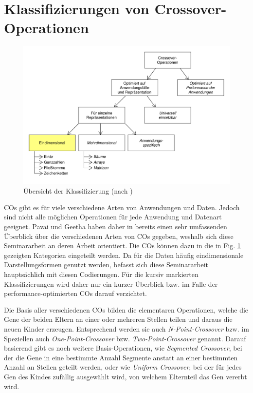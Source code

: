 \documentclass{llncs}
\begin{document}
	\section{Klassifizierungen von Crossover-Operationen}
	\label{sec:KlassCO}
	
	\begin{figure}
		\centering
		\includegraphics[width=.8\columnwidth]{./Figures/Crossover-Klassifizierung.pdf}
		\caption{Übersicht der Klassifizierung (nach \cite{Survey})}
		\label{fig:abb2}
	\end{figure}
	
	COs gibt es für viele verschiedene Arten von Anwendungen und Daten. Jedoch sind nicht alle möglichen Operationen für jede Anwendung und Daten\-art ge\-ei\-gnet. Pavai und Geetha haben daher in \cite{Survey} bereits einen sehr umfassenden Überblick über die verschiedenen Arten von COs gegeben, weshalb sich diese Seminararbeit an deren Arbeit orientiert.	Die COs können dazu in die in Fig. \ref{fig:abb2} gezeigten Kategorien eingeteilt werden. Da für die Daten häufig eindimensionale Darstellungsformen genutzt werden, befasst sich diese Seminararbeit hauptsächlich mit diesen Codierungen. Für die kursiv markierten Klassifizierungen wird daher nur ein kurzer Überblick bzw. im Falle der performance-optimierten COs darauf verzichtet.
	
	Die Basis aller verschiedenen COs bilden die elementaren Operationen, wel\-che die Gene der beiden Eltern an einer oder mehreren Stellen teilen und daraus die neuen Kinder erzeugen. Entsprechend werden sie auch \textit{N-Point-Crossover} bzw. im Speziellen auch \textit{One-Point-Crossover} bzw. \textit{Two-Point-Crossover} ge\-nannt. Darauf basierend gibt es noch weitere Basis-Operationen, wie \textit{Segmented Cross\-over}, bei der die Gene in eine bestimmte Anzahl Segmente anstatt an einer bestimmten Anzahl an Stellen geteilt werden, \cite{GABasicIdeas} oder wie \textit{Uniform Crossover}, bei der für jedes Gen des Kindes zufällig ausgewählt wird, von welchem Elternteil das Gen vererbt wird.
	
\end{document}
